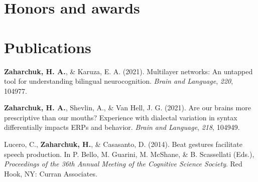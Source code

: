 \documentclass[11pt, a4paper]{awesome-cv}
\begin{document}
\hypertarget{honors-and-awards}{%
\section{Honors and awards}\label{honors-and-awards}}

\begin{cventries}
    \vspace{-4.0mm}
    \vspace{-4.0mm}
    \vspace{-4.0mm}
    \vspace{-4.0mm}
\end{cventries}

\hypertarget{publications}{%
\section{Publications}\label{publications}}

\setlength{\parindent}{-0.2in}
\setlength{\leftskip}{0.2in}

\noindent

\hypertarget{refs_main}{}
\leavevmode\hypertarget{ref-2}{}%
\textbf{\textbf{Zaharchuk, H.} A.}, \& Karuza, E. A. (2021). Multilayer networks: An
untapped tool for understanding bilingual neurocognition. \emph{Brain
and Language}, \emph{220}, 104977.

\leavevmode\hypertarget{ref-3}{}%
\textbf{\textbf{Zaharchuk, H.} A.}, Shevlin, A., \& Van Hell, J. G. (2021). Are our brains
more prescriptive than our mouths? Experience with dialectal variation
in syntax differentially impacts {ERPs} and behavior. \emph{Brain and
Language}, \emph{218}, 104949.

\leavevmode\hypertarget{ref-1}{}%
Lucero, C., \textbf{Zaharchuk, H.}, \& Casasanto, D. (2014). Beat gestures
facilitate speech production. In P. Bello, M. Guarini, M. McShane, \& B.
Scassellati (Eds.), \emph{{Proceedings of the 36th Annual Meeting of the
Cognitive Science Society}}. Red Hook, NY: Curran Associates.
\end{document}
